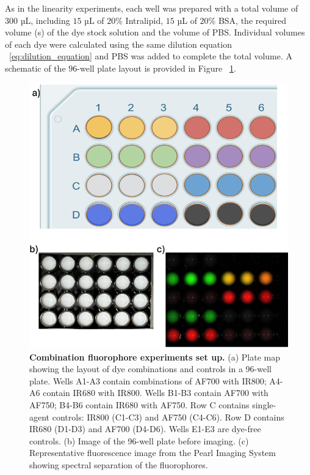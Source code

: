 As in the linearity experiments, each well was prepared with a total volume of $300$ µL, including $15$ µL of $20\%$ Intralipid, $15$ µL of $20\%$ BSA, the required volume (s) of the dye stock solution and the volume of PBS. Individual volumes of each dye were calculated using the same dilution equation ~\ref{eq:dilution_equation} and PBS was added to complete the total volume. A schematic of the 
$96$-well plate layout is provided in Figure ~\ref{fig:plate_map}. 


\begin{figure}[H]
    \centering
    \begin{minipage}{0.7\linewidth}
        \includegraphics[width=\linewidth]{figures/plate-map.png}
        \captionsetup{justification=raggedright, singlelinecheck=false}
        \caption[Combination experiments set up]{
            \textbf{Combination fluorophore experiments set up.} 
            (a) Plate map showing the layout of dye combinations and controls 
            in a 96-well plate. Wells A1-A3 contain combinations of AF700 with IR800; 
            A4-A6 contain IR680 with IR800. Wells B1-B3 contain AF700 with AF750; 
            B4-B6 contain IR680 with AF750. Row C contains single-agent controls: 
            IR800 (C1-C3) and AF750 (C4-C6). Row D contains IR680 (D1-D3) and AF700 (D4-D6). 
            Wells E1-E3 are dye-free controls. 
            (b) Image of the 96-well plate before imaging. 
            (c) Representative fluorescence image from the Pearl Imaging System showing spectral separation of the fluorophores.
        }
        \label{fig:plate_map}
    \end{minipage}
\end{figure}


